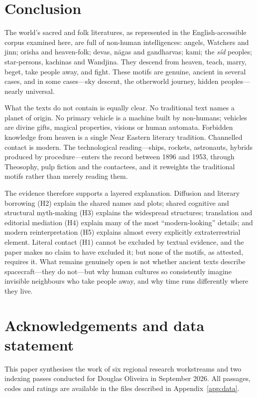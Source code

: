 \documentclass[11pt,a4paper]{article}
\begin{document}
\section{Conclusion}\label{sec:conclusion}

The world's sacred and folk literatures, as represented in the English-accessible corpus examined here, are full of non-human intelligences: angels, Watchers and jinn; orisha and heaven-folk; devas, nāgas and gandharvas; kami; the \emph{síd} peoples; star-persons, kachinas and Wandjina. They descend from heaven, teach, marry, beget, take people away, and fight. These motifs are genuine, ancient in several cases, and in some cases---sky descent, the otherworld journey, hidden peoples---nearly universal.

What the texts do not contain is equally clear. No traditional text names a planet of origin. No primary vehicle is a machine built by non-humans; vehicles are divine gifts, magical properties, visions or human automata. Forbidden knowledge from heaven is a single Near Eastern literary tradition. Channelled contact is modern. The technological reading---ships, rockets, astronauts, hybrids produced by procedure---enters the record between 1896 and 1953, through Theosophy, pulp fiction and the contactees, and it reweights the traditional motifs rather than merely reading them.

The evidence therefore supports a layered explanation. Diffusion and literary borrowing (H2) explain the shared names and plots; shared cognitive and structural myth-making (H3) explains the widespread structures; translation and editorial mediation (H4) explain many of the most ``modern-looking'' details; and modern reinterpretation (H5) explains almost every explicitly extraterrestrial element. Literal contact (H1) cannot be excluded by textual evidence, and the paper makes no claim to have excluded it; but none of the motifs, as attested, requires it. What remains genuinely open is not whether ancient texts describe spacecraft---they do not---but why human cultures so consistently imagine invisible neighbours who take people away, and why time runs differently where they live.

\section*{Acknowledgements and data statement}
This paper synthesises the work of six regional research workstreams and two indexing passes conducted for Douglas Oliveira in September 2026. All passages, codes and ratings are available in the files described in Appendix~\ref{app:data}.
\end{document}
